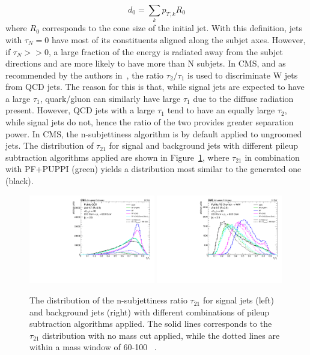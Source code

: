  \begin{equation}
d_0 = \sum_k p_{T,k} R_0
 \end{equation} 
where $R_0$ corresponds to the cone size of the initial jet. With this definition, jets with $\tau_N=0$ have most of its constituents aligned along the subjet axes. However, if $\tau_N>>0$, a large fraction of the energy is radiated away from the subjet directions and are more likely to have more than N subjets.
In CMS, and as recommended by the authors in~\cite{Thaler:2010tr}, the ratio $\tau_2/\tau_1$ is used to discriminate W jets from QCD jets. The reason for this is that, while 
signal jets are expected to have a large $\tau_1$, quark/gluon can similarly have large $\tau_1$ due to the diffuse radiation present. However, QCD jets with a large $\tau_1$ tend to have an equally large $\tau_2$, while signal jets do not, hence the ratio of the two provides greater separation power. In CMS, the n-subjettiness algorithm is by default applied to ungroomed jets.
The distribution of $\tau_{21}$ for signal and background jets with different pileup subtraction algorithms applied are shown in Figure~\ref{fig:objreco:tau21}, where $\tau_21$ in combination with PF+PUPPI (green) yields a distribution most similar to the generated one (black).
\begin{figure}[h] 
    \centering 
    \includegraphics[width=0.490\textwidth]{figures/event_reconstruction/sig_tau21.pdf}
    \includegraphics[width=0.490\textwidth]{figures/event_reconstruction/bkg_tau21.pdf}
     \caption{The distribution of the n-subjettiness ratio $\tau_{21}$ for signal jets (left) and background jets (right) with different combinations of pileup subtraction algorithms applied. The solid lines corresponds to the $\tau_{21}$ distribution with no mass cut applied, while the dotted lines are within a mass window of 60-100 \GeV~\cite{CMS-PAS-JME-14-001}.}
     \label{fig:objreco:tau21}
 \end{figure}


